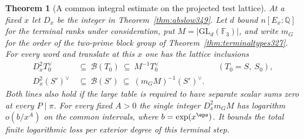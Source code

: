 \documentclass[a4paper,11pt]{article}
\newtheorem{theorem}[proposition]{Theorem}
\theoremstyle{definition}
\theoremstyle{remark}
\numberwithin{equation}{section}
\begin{document}
\begin{theorem}[A common integral estimate on the projected test lattice]\leavevmode
\label{thm:weylperiod351}
At a fixed \(x\) let \(D_x\) be the integer in
Theorem~\ref{thm:abslow349}. Let \(d\) bound \(n[E_x:\mathbb Q]\)
for the terminal ranks under consideration, put
\(M=|\mathrm{GL}_d(\mathbb F_3)|\), and write \(m_G\) for the
order of the two-prime block group of
Theorem~\ref{thm:terminaltypes327}. For every word and translate
at this \(x\) one has the lattice inclusions
\[
 \begin{aligned}
 D_x^2 T_0^\vee&\ \subseteq\ \mathcal B(T_0)\
                      \subseteq\ M^{-1}T_0^\vee
                          &&(T_0=S,\ S_0),\\
 D_x^2 (S')^\vee&\ \subseteq\ \mathcal B(S')\
                      \subseteq\ (m_GM)^{-1}(S')^\vee .
 \end{aligned}
\]
Both lines also hold if the large table is required to have
separate scalar sums zero at every \(P\mid\pi\). For every fixed
\(A>0\) the single integer \(D_x^2m_GM\) has logarithm
\(o(b/x^A)\) on the common intervals, where \(b=\exp(x^\eps)\).
It bounds the total finite logarithmic loss per exterior degree
of this terminal step.
\end{theorem}
\end{document}
